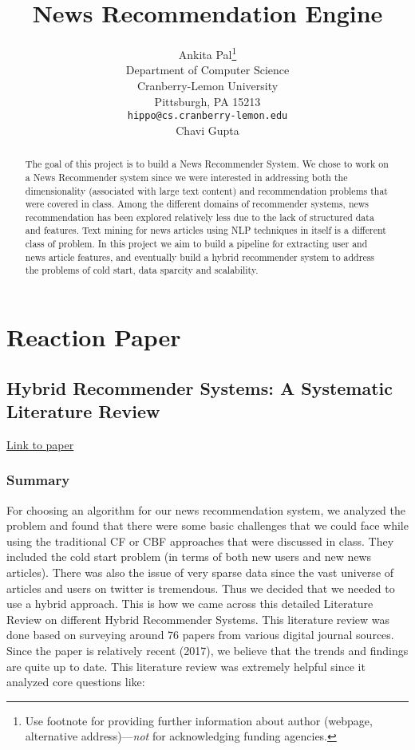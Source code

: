 \documentclass{article}
\title{News Recommendation Engine}
\author{%
  Ankita Pal\thanks{Use footnote for providing further information
    about author (webpage, alternative address)---\emph{not} for acknowledging
    funding agencies.} \\
  Department of Computer Science\\
  Cranberry-Lemon University\\
  Pittsburgh, PA 15213 \\
  \texttt{hippo@cs.cranberry-lemon.edu} \\
  \And
  Chavi Gupta\\
}
\begin{document}
\maketitle

\begin{abstract}
    The goal of this project is to build a News Recommender System. We chose to work on a News Recommender system since we were interested in addressing both the dimensionality (associated with large text content) and recommendation problems that were covered in class. Among the different domains of recommender systems, news recommendation has been explored relatively less due to the lack of structured data and features. Text mining for news articles using NLP techniques in itself is a different class of problem. In this project we aim to build a pipeline for extracting user and news article features, and eventually build a hybrid recommender system to address the problems of cold start, data sparcity and scalability. 
\end{abstract}

\section{Reaction Paper}

\subsection{Hybrid Recommender Systems: A Systematic Literature Review}
\href{https://arxiv.org/pdf/1901.03888.pdf}{Link to paper}

\subsubsection{Summary}
For choosing an algorithm for our news recommendation system, we analyzed the problem and found that there were some basic challenges that we could face while using the traditional CF or CBF approaches that were discussed in class. They included the cold start problem (in terms of both new users and new news articles). There was also the issue of very sparse data since the vast universe of articles and users on twitter is tremendous. Thus we decided that we needed to use a hybrid approach.
This is how we came across this detailed Literature Review on different Hybrid Recommender Systems. This literature review was done based on surveying around 76 papers from various digital journal sources. Since the paper is relatively recent (2017), we believe that the trends and findings are quite up to date. This literature review was extremely helpful since it analyzed core questions like:
\end{document}
